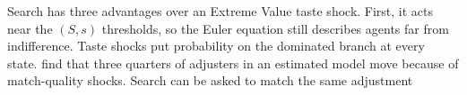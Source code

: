 Search has three advantages over an Extreme Value taste shock. First, it acts near
the $(S,s)$ thresholds, so the Euler equation still describes agents far from
indifference. Taste shocks put probability on the dominated branch at every state.
\citet{McKay2021-ib} find that three quarters of adjusters in an estimated model move
because of match-quality shocks. Search can be asked to match the same adjustment
